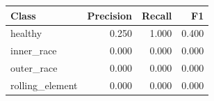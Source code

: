 \begin{tabular}{lrrr}
\hline
Class & Precision & Recall & F1 \\
\hline
healthy & 0.250 & 1.000 & 0.400 \\
inner\_race & 0.000 & 0.000 & 0.000 \\
outer\_race & 0.000 & 0.000 & 0.000 \\
rolling\_element & 0.000 & 0.000 & 0.000 \\
\hline
\end{tabular}
